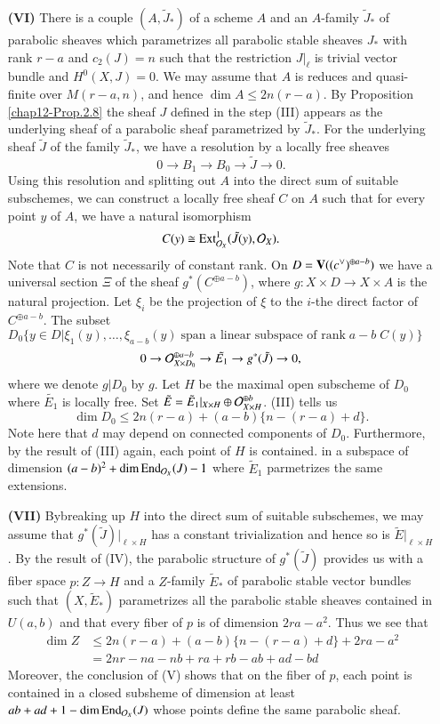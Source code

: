 \begin{itemize}
\item[\bf(VI)] There is a couple $(A, \tilde{J}_{*})$ of a scheme $A$ and an $A$-family $\tilde{J}_{*}$ of parabolic sheaves which parametrizes all parabolic stable sheaves $J_{*}$ with rank $r-a$ and $c_{2}(J)=n$ such that the restriction $J|_{\ell}$ is trivial vector bundle and $H^{0}(X, J)=0$. We may assume that $A$ is reduces and quasi-finite over $M(r-a, n)$, and hence $\dim A\leq 2n(r-a)$. By Proposition \ref{chap12-Prop.2.8} the sheaf $J$ defined in the step (III) appears as the underlying sheaf of a parabolic sheaf parametrized by $\tilde{J}_{*}$. For the underlying sheaf $\tilde{J}$ of the family $\tilde{J}_{*}$, we have a resolution by a locally free sheaves
$$
0 \rightarrow B_{1} \rightarrow B_{0} \rightarrow \tilde{J} \rightarrow 0.
$$
Using this resolution and splitting out $A$ into the direct sum of suitable subschemes, we can construct a locally free sheaf $C$ on $A$ such that for every point $y$ of $A$,  we have a natural isomorphism
$$
C(y) \cong \operatorname{Ext}_{\mathcal{O}_{X}}^{1} (\tilde{J}(y), \mathcal{O}_{X}).
$$
Note that $C$ is not necessarily of constant rank. On $D=\break \bV( (c^{\vee})^{\oplus a-b})$ we have a universal section $\Xi$ of the sheaf $g^{*}(C^{\oplus a-b})$, where $g : X\times D \rightarrow X\times A$ is the natural projection. Let $\xi_{i}$ be the projection of $\xi$ to the $i$-the direct factor of $C^{\oplus a-b}$. The subset $D_{0}\{y \in D | \xi_{1}(y), \ldots, \xi_{a-b}(y)\; \text{span a linear subspace of rank}\; a-b\; C(y)\}$
$$
0 \rightarrow \mathcal{O}_{X\times D_{0}}^{\oplus a-b} \rightarrow \tilde{E_{1}} \rightarrow g^{*} (\tilde{J})\rightarrow 0,
$$
where we denote $g |D_{0}$ by $g$. Let $H$ be the maximal open subscheme of $D_{0}$ where $\tilde{E_{1}}$ is locally free. Set $\tilde{E} = \tilde{E}_{1}|_{X\times H} \oplus \mathcal{O}_{X \times H}^{\oplus b}$. (III) tells us
$$
\dim D_{0}\leq 2n(r-a) + (a-b) \{n-(r-a) + d\}.
$$
Note here that $d$ may depend on connected components of $D_{0}$. Furthermore, by the result of (III) again, each point of $H$ is contained. in a subspace of dimension $(a-b)^{2} + \dim \operatorname{End}_{\mathcal{O}_{X}}(J)-1$ where $\tilde{E}_{1}$ parmetrizes the same extensions.

\item[\bf(VII)] By\pageoriginale breaking up $H$ into the direct sum of suitable subschemes, we may assume that $g^{*}(\tilde{J})|_{\ell \times H}$ has a constant trivialization and hence so is $\tilde{E}|_{\ell\times H}$.
By the result of (IV), the parabolic structure of $g^{*}(\tilde{J})$ provides us with a fiber space $p : Z \rightarrow H$ and a $Z$-family $\tilde{E}_{*}$ of parabolic stable vector bundles such that $(X, \tilde{E}_{*})$ parametrizes all the parabolic stable sheaves contained in $U(a, b)$ and that every fiber of $p$ is of dimension $2ra-a^{2}$. Thus we see that
\begin{align*}
\dim Z &\leq 2n(r-a) + (a-b) \{n -(r-a) + d\} + 2ra-a^{2}\\
 &= 2nr-na -nb +ra +rb -ab + ad-bd
\end{align*}
 Moreover, the conclusion of (V) shows that on the fiber of $p$, each point is contained in a closed subsheme of dimension at least $ab + ad + 1-\dim \operatorname{End}_{\mathcal{O}_{X}}(J)$ whose points define the same parabolic sheaf.


\end{itemize}
